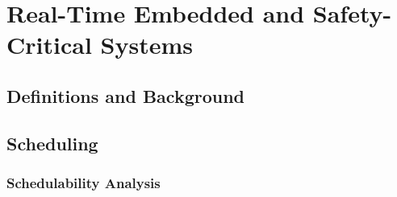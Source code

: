 \chapter{Real-Time Embedded and Safety-Critical Systems}
\label{chapter:rts}

\section{Definitions and Background} %
\label{sec:definitions_and_background}


\section{Scheduling} %
\label{sec:scheduling}


\subsection{Schedulability Analysis} %
\label{sec:schedulability_analysis}


